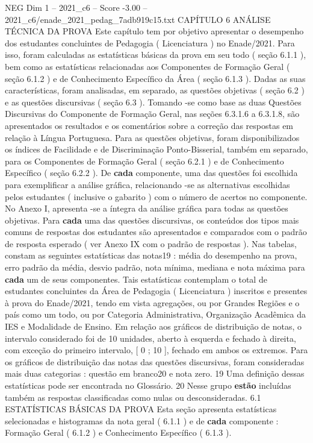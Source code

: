 \begin{textsample}{NEG Dim 1 – 2021\_c6 – Score -3.00 – 2021\_c6/enade\_2021\_pedag\_7adb919c15.txt}  \label{ex:f1_neg_236}
CAPÍTULO 6 ANÁLISE TÉCNICA DA PROVA Este capítulo tem por objetivo apresentar o desempenho dos estudantes concluintes de Pedagogia ( Licenciatura ) no Enade/2021.
Para isso, foram calculadas as estatísticas básicas da prova em seu todo ( seção 6.1.1 ), bem como as estatísticas relacionadas aos Componentes de Formação Geral ( seção 6.1.2 ) e de Conhecimento Específico da Área ( seção 6.1.3 ).
Dadas as suas características, foram analisadas, em separado, as questões objetivas ( seção 6.2 ) e as questões discursivas ( seção 6.3 ).
Tomando -se como base as duas Questões Discursivas do Componente de Formação Geral, nas seções 6.3.1.6 a 6.3.1.8, são apresentados os resultados e os comentários sobre a correção das respostas em relação à Língua Portuguesa.
Para as questões objetivas, foram disponibilizados os índices de Facilidade e de Discriminação Ponto-Bisserial, também em separado, para os Componentes de Formação Geral ( seção 6.2.1 ) e de Conhecimento Específico ( seção 6.2.2 ).
De \textbf{cada} componente, uma das questões foi escolhida para exemplificar a análise gráfica, relacionando -se as alternativas escolhidas pelos estudantes ( inclusive o gabarito ) com o número de acertos no componente.
No Anexo I, apresenta -se a íntegra da análise gráfica para todas as questões objetivas.
Para \textbf{cada} uma das questões discursivas, os conteúdos dos tipos mais comuns de respostas dos estudantes são apresentados e comparados com o padrão de resposta esperado ( ver Anexo IX com o padrão de respostas ).
Nas tabelas, constam as seguintes estatísticas das notas19 : média do desempenho na prova, erro padrão da média, desvio padrão, nota mínima, mediana e nota máxima para \textbf{cada} um de seus componentes.
Tais estatísticas contemplam o total de estudantes concluintes da Área de Pedagogia ( Licenciatura ) inscritos e presentes à prova do Enade/2021, tendo em vista agregações, ou por Grandes Regiões e o país como um todo, ou por Categoria Administrativa, Organização Acadêmica da IES e Modalidade de Ensino.
Em relação aos gráficos de distribuição de notas, o intervalo considerado foi de 10 unidades, aberto à esquerda e fechado à direita, com exceção do primeiro intervalo, [ 0 ; 10 ], fechado em ambos os extremos.
Para os gráficos de distribuição das notas das questões discursivas, foram consideradas mais duas categorias : questão em branco20 e nota zero. 19 Uma definição dessas estatísticas pode ser encontrada no Glossário. 20 Nesse grupo \textbf{estão} incluídas também as respostas classificadas como nulas ou desconsideradas. 6.1 ESTATÍSTICAS BÁSICAS DA PROVA Esta seção apresenta estatísticas selecionadas e histogramas da nota geral ( 6.1.1 ) e de \textbf{cada} componente : Formação Geral ( 6.1.2 ) e Conhecimento Específico ( 6.1.3 ).

\end{textsample}
